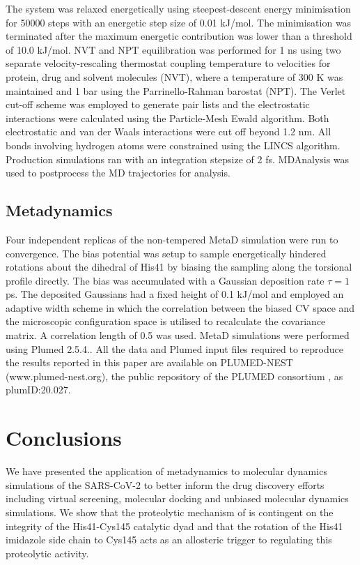 The system was relaxed energetically using steepest-descent energy minimisation for 50000 steps with an energetic step size of 0.01 kJ/mol. The minimisation was terminated after the maximum energetic contribution was lower than a threshold of 10.0 kJ/mol. NVT and NPT equilibration was performed for 1 ns using two separate velocity-rescaling thermostat coupling temperature to velocities for protein, drug and solvent molecules (NVT), where a temperature of 300 K was maintained and 1 bar using the Parrinello-Rahman barostat (NPT).\cite{parrinello1981polymorphic} The Verlet cut-off scheme was employed to generate pair lists and the electrostatic interactions were calculated using the Particle-Mesh Ewald algorithm.\cite{pme} Both electrostatic and van der Waals interactions were cut off beyond 1.2 nm. All bonds involving hydrogen atoms were constrained using the LINCS algorithm.\cite{hess1997lincs} Production simulations ran with an integration stepsize of 2 fs. MDAnalysis was used to postprocess the MD trajectories for analysis.\cite{mdanalysis1, mdanalysis2}\\

\subsection{Metadynamics}
Four independent replicas of the non-tempered MetaD simulation were run to convergence.\cite{metaD} The bias potential was setup to sample energetically hindered rotations about the \dihtwo dihedral of His41 by biasing the sampling along the \dihone torsional profile directly. The bias was accumulated with a Gaussian deposition rate $\tau = 1$ ps. The deposited Gaussians had a fixed height of 0.1 kJ/mol and employed an adaptive width scheme in which the correlation between the biased CV space and the microscopic configuration space is utilised to recalculate the covariance matrix. A correlation length of 0.5 was used.\cite{adaptive} MetaD simulations were performed using Plumed 2.5.4.\cite{plumed}. All the data and Plumed input files required to reproduce the results reported in this paper are available on PLUMED-NEST (www.plumed-nest.org), the public repository of the PLUMED consortium \cite{plumed}, as plumID:20.027. 
%
%
%
%
%
%
\section{Conclusions}
We have presented the application of metadynamics to molecular dynamics simulations of the SARS-CoV-2  to better inform the drug discovery efforts including virtual screening, molecular docking and unbiased molecular dynamics simulations. We show that the proteolytic mechanism of  is contingent on the integrity of the His41-Cys145 catalytic dyad and that the rotation of the His41 imidazole side chain to Cys145 acts as an allosteric trigger to regulating this proteolytic activity.\\

